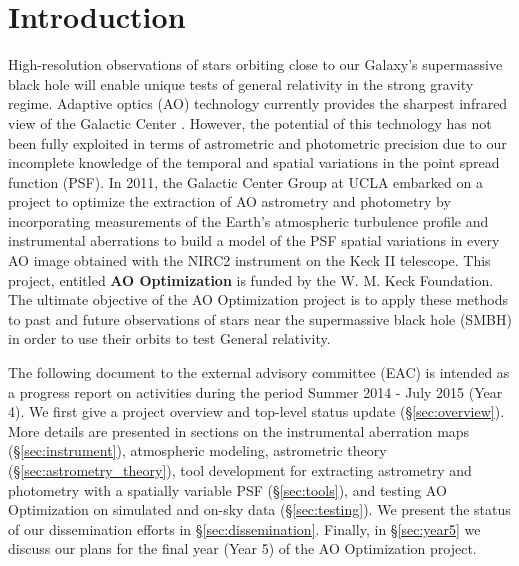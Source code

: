\section{Introduction}

High-resolution observations of stars orbiting close to our Galaxy's supermassive black hole will enable unique tests of general relativity in the strong gravity regime. Adaptive optics (AO) technology currently provides the sharpest infrared view of the Galactic Center \cite{Ghez_2005}. However, the potential of this technology has not been fully exploited in terms of astrometric and photometric precision due to our incomplete knowledge of the temporal and spatial variations in the point spread function (PSF). In 2011, the Galactic Center Group at UCLA embarked on a project to optimize the extraction of AO astrometry and photometry by incorporating measurements of the Earth's atmospheric turbulence profile and instrumental aberrations to build a model of the PSF spatial variations in every AO image obtained with the NIRC2 instrument on the Keck II telescope. This project, entitled \textbf{AO Optimization} is funded by the W. M. Keck Foundation. The ultimate objective of the AO Optimization project is to apply these methods to past and future observations of stars near the supermassive black hole (SMBH) in order to use their orbits to test General relativity. 

The following document to the external advisory committee (EAC) is intended as a progress report on activities during the period Summer 2014 - July 2015 (Year 4). We first give a project overview and top-level status update (\S\ref{sec:overview}). More details are presented in sections on the instrumental aberration maps (\S\ref{sec:instrument}), atmospheric modeling, astrometric theory (\S\ref{sec:astrometry_theory}), tool development for extracting astrometry and photometry with a spatially variable PSF (\S\ref{sec:tools}), and testing AO Optimization on simulated and on-sky data (\S\ref{sec:testing}). We present the status of our dissemination efforts in \S\ref{sec:dissemination}. Finally, in \S\ref{sec:year5} we discuss our plans for the final year (Year 5) of the AO Optimization project.



  